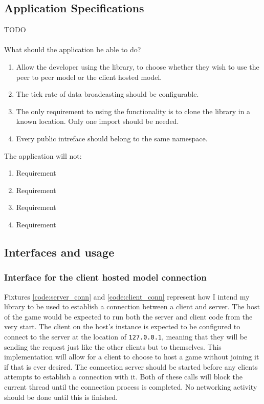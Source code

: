 \subsection{Application Specifications}
TODO
\\
\\
What should the application be able to do?
\begin{enumerate}
\item Allow the developer using the library, to choose whether they wish to use the peer to peer model or the client hosted model.
\item The tick rate of data broadcasting should be configurable.
\item The only requirement to using the functionality is to clone the library in a known location. Only one import should be needed.
\item Every public intreface should belong to the same namespace.
\end{enumerate}
The application will not:
\begin{enumerate}
\item Requirement
\item Requirement
\item Requirement
\item Requirement
\end{enumerate}

\newpage
\subsection{Interfaces and usage}

\subsubsection{Interface for the client hosted model connection}
Fixtures \ref{code:server_conn} and \ref{code:client_conn} represent how I intend my library to be used to establish a connection between a client and server. The host of the game would be expected to run both the server and client code from the very start. The client on the host's instance is expected to be configured to connect to the server at the location of \lstinline{127.0.0.1}, meaning that they will be sending the request just like the other clients but to themselves. This implementation will allow for a client to choose to host a game without joining it if that is ever desired. The connection server should be started before any clients attempts to establish a connection with it. Both of these calls will block the current thread until the connection process is completed. No networking activity should be done until this is finished.


